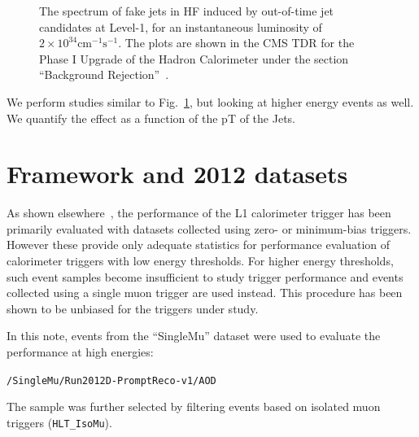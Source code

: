 \documentclass[11pt]{cmspaperpdf}
\begin{document}
\vspace{5mm}
\begin{figure}[h!]
\centering
\setlength\fboxsep{0pt}
\setlength\fboxrule{0.2pt}
\caption{The spectrum of fake jets in HF induced by out-of-time jet candidates at Level-1, for an instantaneous luminosity of $2 \times 10^{34} \textrm{cm}^{-1} \textrm{s}^{-1}$. The plots are shown in the CMS TDR for the Phase I Upgrade of the Hadron Calorimeter under the section ``Background Rejection''~\cite{hcaltdr}.}
\label{fig:hcaltdr_plot}
\end{figure}
\vspace{5mm}

We perform studies similar to Fig.~\ref{fig:hcaltdr_plot}, but looking at higher energy events as well. We quantify the effect as a function of the pT of the Jets.

\newpage

\section{Framework and 2012 datasets}
\label{sec:tech}

As shown elsewhere~\cite{}, the performance of the L1 calorimeter trigger has been primarily evaluated with datasets collected using zero- or minimum-bias triggers. However these provide only adequate statistics for performance evaluation of calorimeter triggers with low energy thresholds. For higher energy thresholds, such event samples become insufficient to study trigger performance and events collected using a single muon trigger are used instead. This procedure has been shown to be unbiased for the triggers under study.

In this note, events from the ``SingleMu'' dataset were used to evaluate the performance at high energies:

\texttt{/SingleMu/Run2012D-PromptReco-v1/AOD}

The sample was further selected by filtering events based on isolated muon triggers (\texttt{HLT\_IsoMu}).
\end{document}
